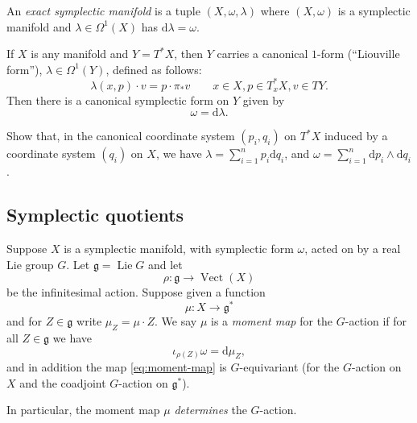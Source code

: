 \documentclass[12pt,letterpaper,reqno]{article}
\numberwithin{equation}{section}
\newcommand{\fg}{{\mathfrak g}}
\newcommand{\de}{\mathrm{d}}
\newcommand{\ti}[1]{\textit{#1}}
\DeclareMathOperator{\Lie}{Lie}
\DeclareMathOperator{\Vect}{Vect}
\begin{document}
\begin{defn}
An \ti{exact symplectic manifold} is a tuple $(X,\omega,\lambda)$
where $(X,\omega)$ is a symplectic manifold and $\lambda \in \Omega^1(X)$ has $\de \lambda = \omega$.
\end{defn}

\begin{example}
If $X$ is any manifold and $Y = T^* X$, then $Y$ carries a canonical
$1$-form (``Liouville form''), $\lambda \in \Omega^1(Y)$,
defined as follows:
\begin{equation}
  \lambda(x,p) \cdot v = p \cdot \pi_* v \qquad x \in X, p \in T^*_x X, v \in TY.
\end{equation}
Then there is a canonical symplectic form on $Y$ given by
\begin{equation}
\omega = \de \lambda.
\end{equation}
\end{example}

\begin{exercise}
Show that, in the canonical coordinate system $(p_i,q_i)$
on $T^* X$ induced by a coordinate system $(q_i)$ on $X$,
we have
$\lambda = \sum_{i=1}^n p_i \de q_i$, and
$\omega = \sum_{i=1}^n \de p_i \wedge \de q_i$.
\end{exercise}


\subsection{Symplectic quotients}

\begin{defn} \label{def:moment-map}
Suppose $X$ is a symplectic manifold, with symplectic form $\omega$,
acted on by a real Lie group $G$. Let $\fg = \Lie G$ and let
\begin{equation}
\rho: \fg \to \Vect(X)
\end{equation}
be the infinitesimal action.
Suppose given a function
\begin{equation} \label{eq:moment-map}
 \mu: X \to \fg^*
\end{equation}
and for $Z \in \fg$ write $\mu_Z = \mu \cdot Z$.
We say $\mu$ is a \ti{moment map} for the $G$-action if
for all $Z \in \fg$ we have
\begin{equation} \label{eq:moment-map-condition-3}
  \iota_{\rho(Z)} \omega = \de \mu_Z,
\end{equation}
and in addition the map \eqref{eq:moment-map} is $G$-equivariant
(for the $G$-action on $X$ and the coadjoint $G$-action on $\fg^*$).
\end{defn}
In particular, the moment map $\mu$
\ti{determines} the $G$-action.
\end{document}
